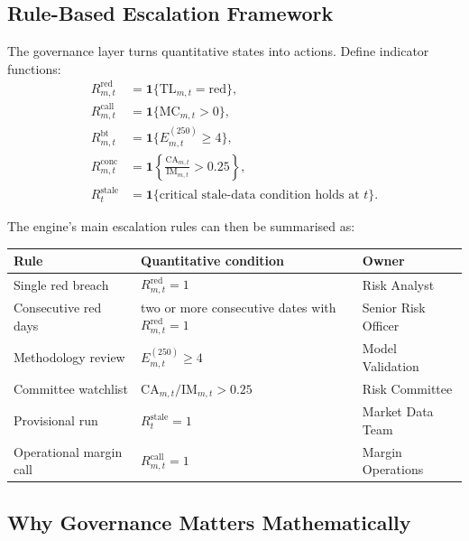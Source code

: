 \documentclass[11pt]{article}
\begin{document}
\subsection{Rule-Based Escalation Framework}

The governance layer turns quantitative states into actions. Define indicator functions:
\begin{align*}
R_{m,t}^{\text{red}} &= \mathbf{1}\{\text{TL}_{m,t} = \text{red}\},\\
R_{m,t}^{\text{call}} &= \mathbf{1}\{\text{MC}_{m,t} > 0\},\\
R_{m,t}^{\text{bt}} &= \mathbf{1}\{E_{m,t}^{(250)} \ge 4\},\\
R_{m,t}^{\text{conc}} &= \mathbf{1}\left\{\frac{\text{CA}_{m,t}}{\text{IM}_{m,t}} > 0.25\right\},\\
R_t^{\text{stale}} &= \mathbf{1}\{\text{critical stale-data condition holds at } t\}.
\end{align*}

The engine's main escalation rules can then be summarised as:

\begin{center}
\begin{tabular}{>{\raggedright\arraybackslash}p{} >{\raggedright\arraybackslash}p{} >{\raggedright\arraybackslash}p{}}
\toprule
Rule & Quantitative condition & Owner \\
\midrule
Single red breach & \(R_{m,t}^{\text{red}}=1\) & Risk Analyst \\
Consecutive red days & two or more consecutive dates with \(R_{m,t}^{\text{red}}=1\) & Senior Risk Officer \\
Methodology review & \(E_{m,t}^{(250)} \ge 4\) & Model Validation \\
Committee watchlist & \(\text{CA}_{m,t}/\text{IM}_{m,t} > 0.25\) & Risk Committee \\
Provisional run & \(R_t^{\text{stale}}=1\) & Market Data Team \\
Operational margin call & \(R_{m,t}^{\text{call}}=1\) & Margin Operations \\
\bottomrule
\end{tabular}
\end{center}

\subsection{Why Governance Matters Mathematically}
\end{document}
